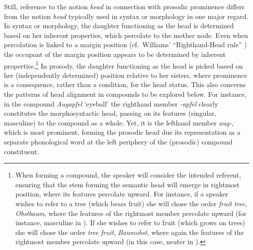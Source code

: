 \documentclass[output=paper
 ,nobabel
 ,draftmode
 ,colorlinks, citecolor=brown
]{langscibook}
\begin{document}
\largerpage[-1]
\noindent
Still, reference to the notion \emph{head} in connection with  prosodic prominence differs from the
notion \emph{head} typically used in syntax or morphology in one major regard. In syntax or
morphology, the daughter functioning as the head is determined based on her inherent properties,
which percolate to the mother node. Even when percolation is linked to a margin position (cf.\
Williams' ``Righthand-Head rule'' \citealp[248]{Williams1981}) the occupant of the margin position
appears to be determined by inherent properties.\footnote{When forming a compound, the speaker will
  consider the intended referent, ensuring that the stem forming the semantic head will emerge in
  rightmost position, where its features percolate upward. For instance, if a speaker wishes to
  refer to a tree (which bears fruit) she will chose the order \emph{fruit tree}, 
  \emph{Obstbaum}, where the features of the rightmost member percolate upward (for instance,
  masculine in ). If she wishes to refer to fruit (which grows on trees) she will chose the
  order \emph{tree fruit},  \emph{Baumobst}, where again the features of the rightmost member
  percolate upward (in this case, neuter in \ili{German}).} In prosody, the daughter functioning as the
head is picked based on her (independently determined) position relative to her sisters, where
prominence is a consequence, rather than a condition, for the head status. This also concerns the
patterns of head alignment in  compounds to be explored below. For instance, in the \ili{German}
compound \emph{Augapfel} `eyeball' the righthand member \emph{-apfel} clearly constitutes the
morphosyntactic head, passing on its features (singular, masculine) to the compound as a whole. Yet,
it is the lefthand member \emph{aug-}, which is most prominent, forming the prosodic head due its
representation as a separate phonological word at the left periphery of the (prosodic) compound
constituent. 
\end{document}
